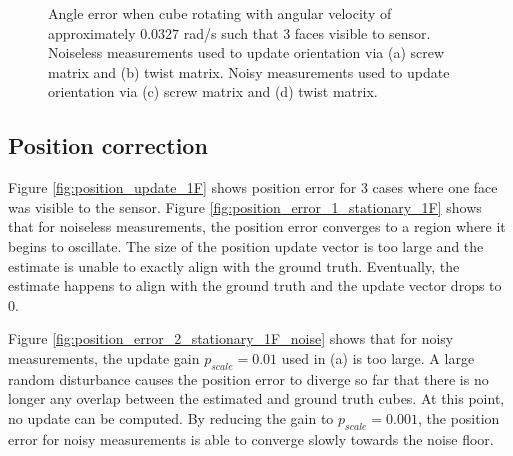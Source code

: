 \begin{figure}
{\begin{minipage}[b]{0.45\columnwidth}
 	\end{minipage}}
 	\caption{Angle error when cube rotating with angular velocity of approximately $0.0327$ rad/s such that 3 faces visible to sensor. Noiseless measurements used to update orientation via (a) screw matrix and (b) twist matrix. Noisy measurements used to update orientation via (c) screw matrix and (d) twist matrix.}
 	\label{fig:angle_error_rotating}
\end{figure}

\subsection{Position correction}
Figure \ref{fig:position_update_1F} shows position error for 3 cases where one face was visible to the sensor. Figure \ref{fig:position_error_1_stationary_1F} shows that for noiseless measurements, the position error converges to a region where it begins to oscillate. The size of the position update vector is too large and the estimate is unable to exactly align with the ground truth. Eventually, the estimate happens to align with the ground truth and the update vector drops to 0.

Figure \ref{fig:position_error_2_stationary_1F_noise} shows that for noisy measurements, the update gain $p_{scale} = 0.01$ used in (a) is too large. A large random disturbance causes the position error to diverge so far that there is no longer any overlap between the estimated and ground truth cubes. At this point, no update can be computed.
By reducing the gain to $p_{scale} = 0.001$, the position error for noisy measurements is able to converge slowly towards the noise floor.

